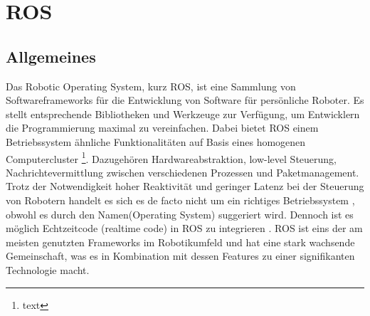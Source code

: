\section{ROS}
\label{ROS}
\subsection{Allgemeines}
Das Robotic Operating System, kurz ROS, ist eine Sammlung von Softwareframeworks für die Entwicklung von Software für persönliche Roboter. Es stellt entsprechende Bibliotheken und Werkzeuge zur Verfügung, um Entwicklern die Programmierung maximal zu vereinfachen. Dabei bietet ROS einem Betriebssystem ähnliche Funktionalitäten auf Basis eines homogenen Computercluster \footnote{text}. Dazugehören Hardwareabstraktion, low-level Steuerung, Nachrichtevermittlung zwischen verschiedenen Prozessen und Paketmanagement. Trotz der Notwendigkeit hoher Reaktivität und geringer Latenz bei der Steuerung von Robotern handelt es sich es de facto nicht um ein richtiges Betriebssystem , obwohl es durch den Namen(\grqq Operating System\grqq) suggeriert wird. Dennoch ist es möglich Echtzeitcode (\grqq realtime code\grqq) in ROS zu integrieren \cite{realtimecode}. ROS ist eins der am meisten genutzten Frameworks im Robotikumfeld und hat eine stark wachsende Gemeinschaft, was es in Kombination mit dessen Features zu einer signifikanten Technologie macht.\cite{rosbook} \cite{rosgeneral}


